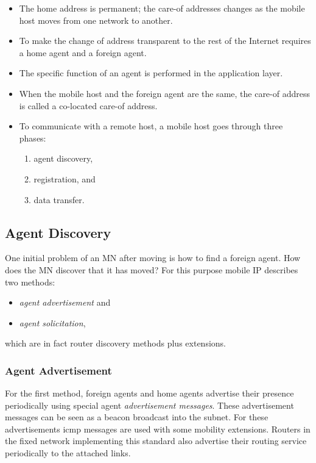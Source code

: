 \begin{itemize}
	\item The home address is permanent; the care-of addresses changes as the mobile host moves from one network to another. 
	\item To make the change of address transparent to the rest of the Internet requires a home agent and a foreign agent. 
	\item The specific function of an agent is performed in the application layer. 
	\item When the mobile host and the foreign agent are the same, the care-of address is called a co-located care-of address. 
	\item To communicate with a remote host, a mobile host goes through three phases:
	\begin{enumerate}
		\item agent discovery, 
		\item registration, and 
		\item data transfer.
	\end{enumerate}
	 
\end{itemize}


\subsection{Agent Discovery}
One initial problem of an MN after moving is how to find a foreign agent. How does the MN discover that it has moved? For this purpose mobile IP describes two methods: 

\begin{itemize}
\item \textit{agent advertisement} and 
\item \textit{agent solicitation},
\end{itemize}
which are in fact router discovery methods plus extensions.

\subsubsection{Agent Advertisement}
For the first method, foreign agents and home agents advertise their presence periodically using special agent \textit{advertisement messages}. These advertisement messages can be seen as a beacon broadcast into the subnet. For these advertisements \gls{icmp} messages are used with some mobility extensions. Routers in the fixed network implementing this standard also advertise their routing service periodically to the attached links.

